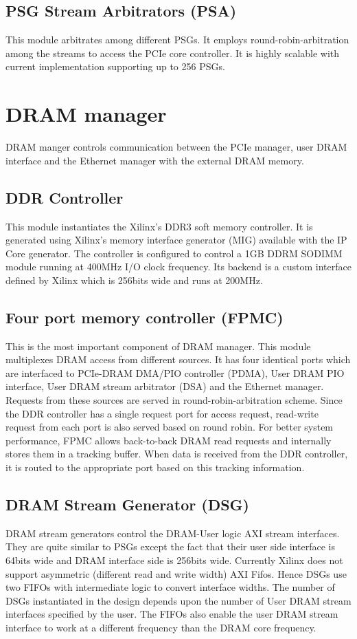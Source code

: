 \subsection{PSG Stream Arbitrators (PSA)}
This module arbitrates among different PSGs.
It employs round-robin-arbitration among the streams to access the PCIe core controller.
It is highly scalable with current implementation supporting up to 256 PSGs.

\section{DRAM manager}
DRAM manger controls communication between the PCIe manager, user DRAM interface and the Ethernet manager with the external DRAM memory.
\subsection{DDR Controller}
This module instantiates the Xilinx's DDR3 soft memory controller.
It is generated using Xilinx's memory interface generator (MIG) available with the IP Core generator.
The controller is configured to control a 1GB DDRM SODIMM module running at 400MHz I/O clock frequency.
Its backend is a custom interface defined by Xilinx which is 256bits wide and runs at 200MHz.
\subsection{Four port memory controller (FPMC)}
This is the most important component of DRAM manager.
This module multiplexes DRAM access from different sources.
It has four identical ports which are interfaced to PCIe-DRAM DMA/PIO controller (PDMA), User DRAM PIO interface, User DRAM stream arbitrator (DSA) and the Ethernet manager.
Requests from these sources are served in round-robin-arbitration scheme.
Since the DDR controller has a single request port for access request, read-write request from each port is also served based on round robin.
For better system performance, FPMC allows back-to-back DRAM read requests and internally stores them in a tracking buffer.
When data is received from the DDR controller, it is routed to the appropriate port based on this tracking information.
\subsection{DRAM Stream Generator (DSG)}
DRAM stream generators control the DRAM-User logic AXI stream interfaces.
They are quite similar to PSGs except the fact that their user side interface is 64bits wide and DRAM interface side is 256bits wide.
Currently Xilinx does not support asymmetric (different read and write width) AXI Fifos.
Hence DSGs use two FIFOs with intermediate logic to convert interface widths.
The number of DSGs instantiated in the design depends upon the number of User DRAM stream interfaces specified by the user.
The FIFOs also enable the user DRAM stream interface to work at a different frequency than the DRAM core frequency.

